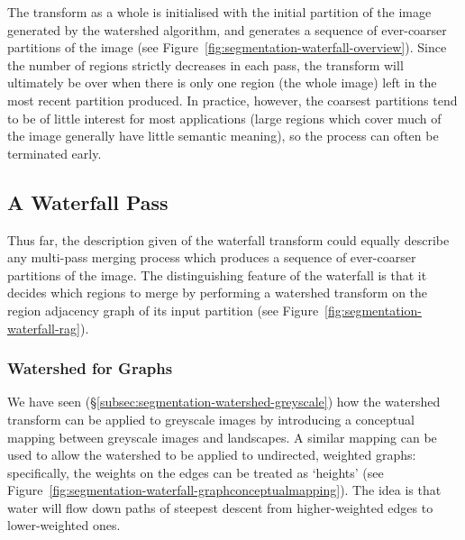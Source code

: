 
The transform as a whole is initialised with the initial partition of the image generated by the watershed algorithm, and generates a sequence of ever-coarser partitions of the image (see Figure~\ref{fig:segmentation-waterfall-overview}). Since the number of regions strictly decreases in each pass, the transform will ultimately be over when there is only one region (the whole image) left in the most recent partition produced. In practice, however, the coarsest partitions tend to be of little interest for most applications (large regions which cover much of the image generally have little semantic meaning), so the process can often be terminated early.


\subsection{A Waterfall Pass}

Thus far, the description given of the waterfall transform could equally describe any multi-pass merging process which produces a sequence of ever-coarser partitions of the image. The distinguishing feature of the waterfall is that it decides which regions to merge by performing a watershed transform on the region adjacency graph of its input partition (see Figure~\ref{fig:segmentation-waterfall-rag}).


\subsubsection{Watershed for Graphs}

We have seen (\S\ref{subsec:segmentation-watershed-greyscale}) how the watershed transform can be applied to greyscale images by introducing a conceptual mapping between greyscale images and landscapes. A similar mapping can be used to allow the watershed to be applied to undirected, weighted graphs: specifically, the weights on the edges can be treated as `heights' (see Figure~\ref{fig:segmentation-waterfall-graphconceptualmapping}). The idea is that water will flow down paths of steepest descent from higher-weighted edges to lower-weighted ones.



